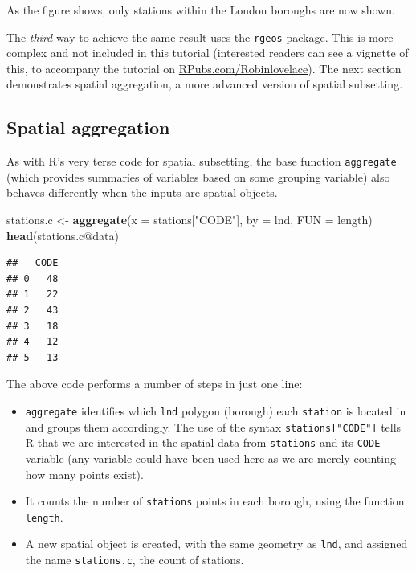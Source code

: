 \documentclass[]{article}
\newenvironment{Shaded}{}{}
\newcommand{\KeywordTok}[1]{\textcolor[rgb]{0.00,0.44,0.13}{\textbf{{#1}}}}
\newcommand{\DataTypeTok}[1]{\textcolor[rgb]{0.56,0.13,0.00}{{#1}}}
\newcommand{\StringTok}[1]{\textcolor[rgb]{0.25,0.44,0.63}{{#1}}}
\newcommand{\NormalTok}[1]{{#1}}
\begin{document}
As the figure shows, only stations within the London boroughs are now
shown.

The \emph{third} way to achieve the same result uses the \texttt{rgeos}
package. This is more complex and not included in this tutorial
(interested readers can see a vignette of this, to accompany the
tutorial on
\href{http://rpubs.com/RobinLovelace/11796}{RPubs.com/Robinlovelace}).
The next section demonstrates spatial aggregation, a more advanced
version of spatial subsetting.

\subsection{Spatial aggregation}\label{spatial-aggregation}

As with R's very terse code for spatial subsetting, the base function
\texttt{aggregate} (which provides summaries of variables based on some
grouping variable) also behaves differently when the inputs are spatial
objects.

\begin{Shaded}
\begin{Highlighting}[]
\NormalTok{stations.c <-}\StringTok{ }\KeywordTok{aggregate}\NormalTok{(}\DataTypeTok{x =} \NormalTok{stations[}\StringTok{"CODE"}\NormalTok{], }\DataTypeTok{by =} \NormalTok{lnd, }\DataTypeTok{FUN =} \NormalTok{length)}
\KeywordTok{head}\NormalTok{(stations.c@data)}
\end{Highlighting}
\end{Shaded}

\begin{verbatim}
##   CODE
## 0   48
## 1   22
## 2   43
## 3   18
## 4   12
## 5   13
\end{verbatim}

The above code performs a number of steps in just one line:

\begin{itemize}
\itemsep1pt\parskip0pt
\item
  \texttt{aggregate} identifies which \texttt{lnd} polygon (borough)
  each \texttt{station} is located in and groups them accordingly. The
  use of the syntax \texttt{stations{[}"CODE"{]}} tells R that we are
  interested in the spatial data from \texttt{stations} and its
  \texttt{CODE} variable (any variable could have been used here as we
  are merely counting how many points exist).
\item
  It counts the number of \texttt{stations} points in each borough,
  using the function \texttt{length}.
\item
  A new spatial object is created, with the same geometry as
  \texttt{lnd}, and assigned the name \texttt{stations.c}, the count of
  stations.
\end{itemize}
\end{document}
